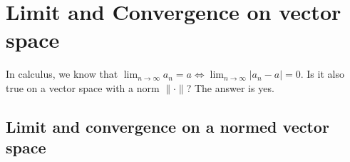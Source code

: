 \documentclass[11pt]{article}
\begin{document}
\section{Limit and Convergence on vector space}
In calculus, we know that $\lim_{n \to \infty} a_n =  a \iff \lim_{n \to \infty} |a_n - a| = 0$. Is it also true on a vector space with a norm $\|\cdot\|$? The answer is yes.
\subsection{Limit and convergence on a normed vector space}
\end{document}
